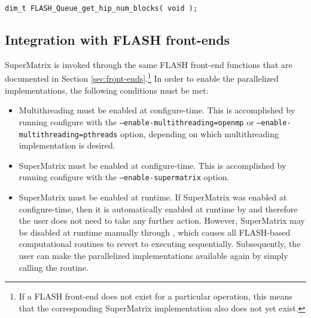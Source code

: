 
\begin{flaspec}
\begin{verbatim}
dim_t FLASH_Queue_get_hip_num_blocks( void );
\end{verbatim}
\end{flaspec}



\subsection{Integration with FLASH front-ends}


SuperMatrix is invoked through the same FLASH front-end functions that
are documented in Section \ref{sec:front-ends}.\footnote{If a FLASH front-end
does not exist for a particular operation, this means that the corresponding
SuperMatrix implementation also does not yet exist.}
In order to enable the parallelized implementations, the following
conditions must be met:
\begin{itemize}

\item
Multithreading must be enabled at configure-time.
This is accomplished by running configure with the
{\tt --enable-multithreading=openmp} or
{\tt --enable-multithreading=pthreads} option, depending on which multithreading
implementation is desired.

\item
SuperMatrix must be enabled at configure-time.
This is accomplished by running configure with the
{\tt --enable-supermatrix} option.

\item
SuperMatrix must be enabled at runtime.
If SuperMatrix was enabled at configure-time, then it is automatically enabled
at runtime by \flainit and therefore the user does not need to take
any further action.
However, SuperMatrix may be disabled at runtime manually through
\flashqueuedisablens, which causes all FLASH-based
computational routines to revert to executing sequentially.
Subsequently, the user can make the parallelized implementations available
again by simply calling the \flashqueueenable
routine.

\end{itemize}

